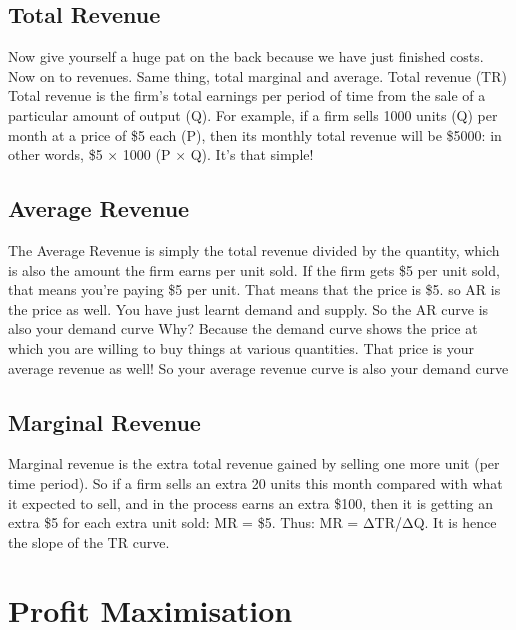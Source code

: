 \subsection{Total Revenue}
Now give yourself a huge pat on the back because we have just finished costs. Now on to revenues. Same thing, total marginal and average. Total revenue (TR) Total revenue is the firm's total earnings per period of time from the sale of a particular amount of output (Q). For example, if a firm sells 1000 units (Q) per month at a price of \$5 each (P), then its monthly total revenue will be \$5000: in other words, \$5 × 1000 (P × Q). It's that simple!
\subsection{Average Revenue}
The Average Revenue is simply the total revenue divided by the quantity, which is also the amount the firm earns per unit sold. If the firm gets \$5 per unit sold, that means you're paying \$5 per unit. That means that the price is \$5. so AR is the price as well. You have just learnt demand and supply. So the AR curve is also your demand curve Why? Because the demand curve shows the price at which you are willing to buy things at various quantities. That price is your average revenue as well! So your average revenue curve is also your demand curve
\subsection{Marginal Revenue}
Marginal revenue is the extra total revenue gained by selling one more unit (per time period). So if a firm sells an extra 20 units this month compared with what it expected to sell, and in the process earns an extra \$100, then it is getting an extra \$5 for each extra unit sold: MR = \$5. Thus: MR = ΔTR/ΔQ. It is hence the slope of the TR curve. 
\section{Profit Maximisation}
